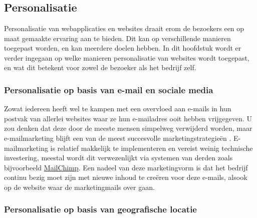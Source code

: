 \chapter{}
\label{ch:stand-van-zaken}



\section{Personalisatie}
\label{sec:Personalisatie}

Personalisatie van webapplicaties en websites draait erom de bezoekers een op maat gemaakte ervaring aan te bieden. Dit kan op verschillende manieren toegepast worden, en kan meerdere doelen hebben. In dit hoofdstuk wordt er verder ingegaan op welke manieren personalisatie van websites wordt toegepast, en wat dit betekent voor zowel de bezoeker als het bedrijf zelf.

\subsection{Personalisatie op basis van e-mail en sociale media}
\label{subsec:Personalisatie op basis van e-mail en Social Media}

Zowat iedereen heeft wel te kampen met een overvloed aan e-mails in hun postvak van allerlei websites waar ze hun e-mailadres ooit hebben vrijgegeven. U zou denken dat deze door de meeste mensen simpelweg verwijderd worden, maar e-mailmarketing blijft een van de meest succesvolle marketingstrategieën \autocite{Dehkordi2012}. E-mailmarketing is relatief makkelijk te implementeren en vereist weinig technische investering, meestal wordt dit verwezenlijkt via systemen van derden zoals bijvoorbeeld \href{https://mailchimp.com/}{MailChimp}. Een nadeel van deze marketingvorm is dat het bedrijf continu bezig moet zijn met nieuwe inhoud te creëren voor deze e-mails, alsook op de website waar de marketingmails over gaan. 

\subsection{Personalisatie op basis van geografische locatie}
\label{subsec:Personalisatie op basis van geografische locatie}

